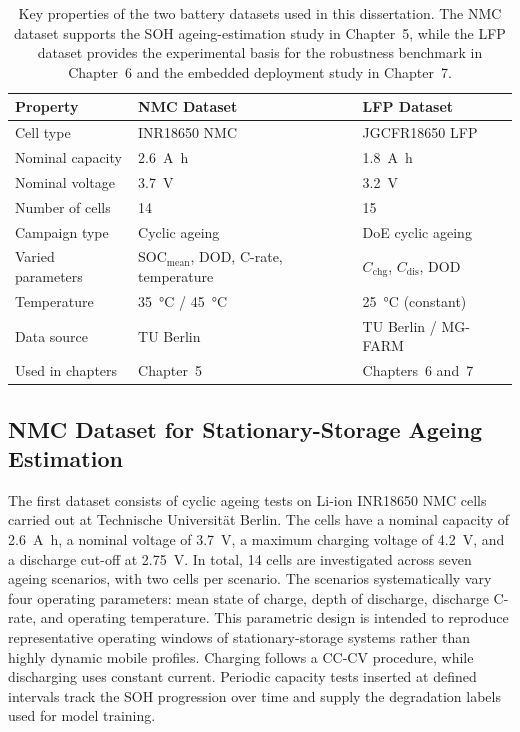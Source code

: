 \documentclass[
    a4paper,
    12pt,
    titlepage,
    bibliography=totoc,
    twoside=on,
    parskip=false,
    numbers=noenddot,
    cleardoublepage=empty,
    DIV=12,
    BCOR=12.0mm,
    headheight=36pt,
    headings=openright
]{scrreprt}
\begin{document}
\begin{table}[H]
    \centering
    \caption[Overview of the two battery datasets.]{Key properties of the two battery datasets used in this dissertation. The NMC dataset supports the SOH ageing-estimation study in Chapter~5, while the LFP dataset provides the experimental basis for the robustness benchmark in Chapter~6 and the embedded deployment study in Chapter~7.}
    \label{tab:dataset_overview}
    \begin{tabularx}{\textwidth}{lYY}
        \toprule
        Property & NMC Dataset & LFP Dataset \\
        \midrule
        Cell type & INR18650 NMC & JGCFR18650 LFP \\
        Nominal capacity & \SI{2.6}{\ampere\hour} & \SI{1.8}{\ampere\hour} \\
        Nominal voltage & \SI{3.7}{\volt} & \SI{3.2}{\volt} \\
        Number of cells & 14 & 15 \\
        Campaign type & Cyclic ageing & DoE cyclic ageing \\
        Varied parameters & SOC$_\mathrm{mean}$, DOD, C-rate, temperature & $C_\mathrm{chg}$, $C_\mathrm{dis}$, DOD \\
        Temperature & \SI{35}{\celsius} / \SI{45}{\celsius} & \SI{25}{\celsius} (constant) \\
        Data source & TU Berlin & TU Berlin / MG-FARM\autocite{lfpDoeCycleAgingDataset2025} \\
        Used in chapters & Chapter~5 & Chapters~6 and~7 \\
        \bottomrule
    \end{tabularx}
\end{table}

\subsection{NMC Dataset for Stationary-Storage Ageing Estimation}

The first dataset consists of cyclic ageing tests on Li-ion INR18650 NMC cells carried out at Technische Universit\"at Berlin. The cells have a nominal capacity of \SI{2.6}{\ampere\hour}, a nominal voltage of \SI{3.7}{\volt}, a maximum charging voltage of \SI{4.2}{\volt}, and a discharge cut-off at \SI{2.75}{\volt}. In total, 14 cells are investigated across seven ageing scenarios, with two cells per scenario. The scenarios systematically vary four operating parameters: mean state of charge, depth of discharge, discharge C-rate, and operating temperature. This parametric design is intended to reproduce representative operating windows of stationary-storage systems rather than highly dynamic mobile profiles. Charging follows a CC-CV procedure, while discharging uses constant current. Periodic capacity tests inserted at defined intervals track the SOH progression over time and supply the degradation labels used for model training.
\end{document}
